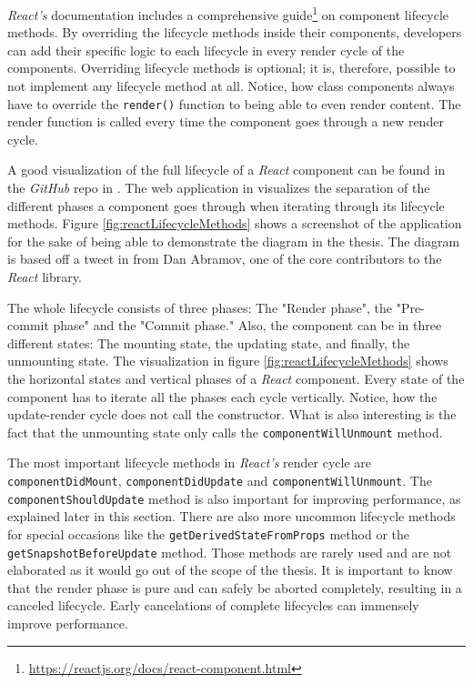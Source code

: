 \emph{React's} documentation includes a comprehensive guide\footnote{\url{https://reactjs.org/docs/react-component.html}} on component lifecycle methods. By overriding the lifecycle methods inside their components, developers can add their specific logic to each lifecycle in every render cycle of the components. Overriding lifecycle methods is optional; it is, therefore, possible to not implement any lifecycle method at all. Notice, how class components always have to override the \texttt{render()} function to being able to even render content. The render function is called every time the component goes through a new render cycle.

A good visualization of the full lifecycle of a \emph{React} component can be found in the \emph{GitHub} repo in \cite{ReactRenderCycleGithub}. The web application in \cite{ReactRenderCycleDiagram} visualizes the separation of the different phases a component goes through when iterating through its lifecycle methods. Figure \ref{fig:reactLifecycleMethods} shows a screenshot of the application for the sake of being able to demonstrate the diagram in the thesis. The diagram is based off a tweet in \cite{ReactCycleTweet} from Dan Abramov, one of the core contributors to the \emph{React} library.

The whole lifecycle consists of three phases: The "Render phase", the "Pre-commit phase" and the "Commit phase." Also, the component can be in three different states: The mounting state, the updating state, and finally, the unmounting state. The visualization in figure \ref{fig:reactLifecycleMethods} shows the horizontal states and vertical phases of a \emph{React} component. Every state of the component has to iterate all the phases each cycle vertically. Notice, how the update-render cycle does not call the constructor. What is also interesting is the fact that the unmounting state only calls the \texttt{componentWillUnmount} method.

The most important lifecycle methods in \emph{React's} render cycle are \texttt{component\-Did\-Mount}, \texttt{component\-Did\-Update} and \texttt{component\-Will\-Unmount}. The \texttt{component\-Should\-Up\-date} method is also important for improving performance, as explained later in this section. There are also more uncommon lifecycle methods for special occasions like the \texttt{getDerivedStateFromProps} method or the \texttt{getSnapshotBeforeUpdate} method. Those methods are rarely used and are not elaborated as it would go out of the scope of the thesis. It is important to know that the render phase is pure and can safely be aborted completely, resulting in a canceled lifecycle. Early cancelations of complete lifecycles can immensely improve performance.

